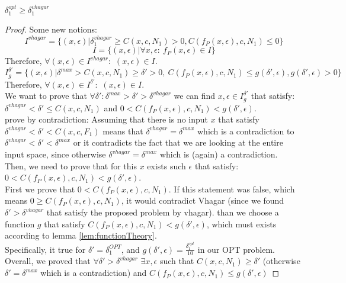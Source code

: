 \begin{lemma}
$\delta_1^{opt} \geq \delta^{vhagar}_1$
\end{lemma}
\begin{proof}
Some new notions:
$$I^{vhagar} = \{(x,\epsilon)|\delta_1^{vhagar} \geq C(x,c,N_1) > 0 , C(f_P(x,\epsilon),c,N_1)\leq 0 \}$$
$$I = \{(x,\epsilon)|\forall{x,\epsilon}:\ f_P(x,\epsilon)\in{I}\}$$
Therefore, $\forall{(x,\epsilon)}\in{I^{vhagar}}:$ $(x,\epsilon)\in{I}$.%
$$I^{\delta'}_g = \{(x,\epsilon)|\delta^{max}> C(x,c,N_1) \geq \delta' > 0 ,\ C(f_P(x,\epsilon),c,N_1)\leq g(\delta',\epsilon), g(\delta',\epsilon)>0 \} $$
Therefore, $\forall{(x,\epsilon)}\in{I^{\delta'}}:$ $(x,\epsilon)\in{I}$.\\
We want to prove that $\forall{\delta'}: \delta^{max} > \delta' > \delta^{vhagar}$ we can find $x,\epsilon\in{I^{\delta'}_g}$ that satisfy: $\delta^{vhagar}<\delta'\leq{C(x,c,N_1)}$ and $0<C(f_P(x,\epsilon),c,N_1)<g(\delta',\epsilon)$.\\
prove by contradiction: Assuming that there is no input $x$ that satisfy $\delta^{vhagar}<\delta'<C(x,c,F_1)$ means that $\delta^{vhagar}=\delta^{max}$ which is a contradiction to $\delta^{vhagar}<\delta'<\delta^{max}$ or it contradicts the fact that we are looking at the entire input space, since otherwise $\delta^{vhagar}=\delta^{max}$ which is (again) a contradiction.\\
Then, we need to prove that for this $x$ exists such $\epsilon$ that satisfy: $0<C(f_P(x,\epsilon),c,N_1)<g(\delta',\epsilon)$.\\
First we prove that $0<C(f_P(x,\epsilon),c,N_1)$. If this statement was false, which means $0 \geq C(f_P(x,\epsilon),c,N_1)$, it would contradict Vhagar (since we found $\delta'>\delta^{vhagar}$ that satisfy the proposed problem by vhagar). than we choose a function $g$ that satisfy $C(f_P(x,\epsilon),c,N_1)<g(\delta',\epsilon)$, which must exists according to lemma \ref{lem:functionTheory}.\\
Specifically, it true for $\delta'=\delta_1^{OPT}$, and $g(\delta',\epsilon)=\frac{\delta_1^{opt}}{10}$ in our OPT problem.\\
Overall, we proved that $\forall{\delta'>\delta^{vhagar}}$ $\exists{x,\epsilon}$ such that $C(x,c,N_1)\geq{\delta'}$ (otherwise $\delta'=\delta^{max}$ which is a contradiction) and $C(f_P(x,\epsilon),c,N_1)\leq{g(\delta',\epsilon)}$

\end{proof}

